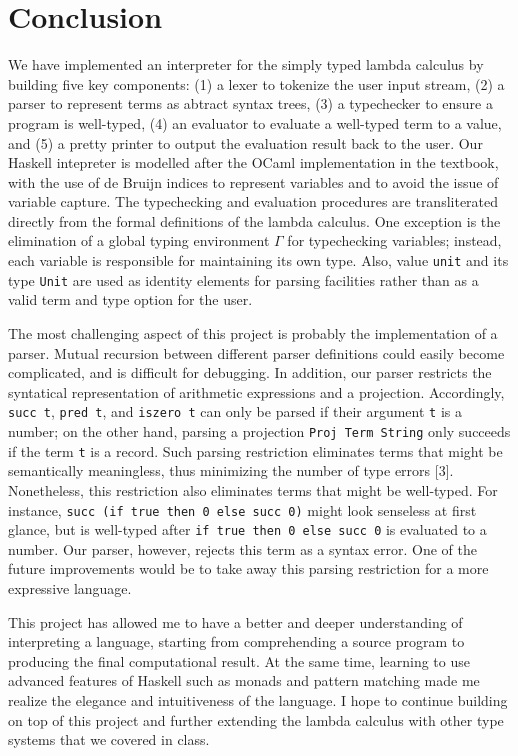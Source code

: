 \documentclass[fleqn, 11pt]{article}
\begin{document}
\section{Conclusion}

We have implemented an interpreter for the simply typed lambda calculus by building five key components: (1) a lexer to tokenize the 
user input stream, (2) a parser to represent terms as abtract syntax trees, (3) a typechecker to ensure a program is well-typed, (4) an 
evaluator to evaluate a well-typed term to a value, and (5) a pretty printer to output the evaluation result back to the user. Our 
Haskell intepreter is modelled after the OCaml implementation in the textbook, with the use of de Bruijn indices to represent variables 
and to avoid the issue of variable capture. The typechecking and evaluation procedures are transliterated directly from the formal 
definitions of the lambda calculus. One exception is the elimination of a global typing environment $\Gamma$ for typechecking variables; 
instead, each variable is responsible for maintaining its own type. Also, value \texttt{unit} and its type \texttt{Unit} are used 
as identity elements for parsing facilities rather than as a valid term and type option for the user. 

The most challenging aspect of this project is probably the implementation of a parser. Mutual recursion between different parser 
definitions could easily become complicated, and is difficult for debugging. In addition, our parser restricts the syntatical 
representation of arithmetic expressions and a projection. Accordingly, \texttt{succ t}, \texttt{pred t}, and \texttt{iszero t} can only 
be parsed if their argument \texttt{t} is a number; on the other hand, parsing a projection \texttt{Proj Term String} only succeeds if the
term \texttt{t} is a record. Such parsing restriction eliminates terms that might be semantically meaningless, thus minimizing the number of type  
errors [3]. Nonetheless, this restriction also eliminates terms that might be well-typed. For instance, \texttt{succ (if true then 0 else succ 0)} 
might look senseless at first glance, but is well-typed after \texttt{if true then 0 else succ 0} is evaluated to a number. Our parser, 
however, rejects this term as a syntax error. One of the future improvements would be to take away this parsing restriction for a 
more expressive language. 

This project has allowed me to have a better and deeper understanding of interpreting a language, starting from comprehending a 
source program to producing the final computational result. At the same time, learning to use advanced features of Haskell such as 
monads and pattern matching made me realize the elegance and intuitiveness of the language. I hope to continue building on top of  
this project and further extending the lambda calculus with other type systems that we covered in class.
\end{document}
